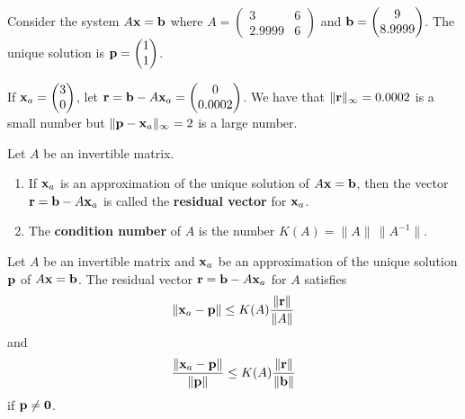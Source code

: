 \begin{egg}
Consider the system $A\mathbf{x} = \mathbf{b}$ where
$\displaystyle
A = \begin{pmatrix}
3 & 6 \\
2.9999 & 6
\end{pmatrix}$ and
$\displaystyle
\mathbf{b} = \begin{pmatrix}
9 \\ 8.9999
\end{pmatrix}
$.
The unique solution is
$\displaystyle
\mathbf{p} = \begin{pmatrix}
1 \\ 1
\end{pmatrix}
$.

If
$\displaystyle
\mathbf{x}_a = \begin{pmatrix}
3 \\ 0
\end{pmatrix}
$, let
$\displaystyle
\mathbf{r} = \mathbf{b} - A\mathbf{x}_a =
\begin{pmatrix}
0 \\ 0.0002
\end{pmatrix}$.
We have that $\|\mathbf{r}\|_\infty = 0.0002$ is a small number but
$\|\mathbf{p} - \mathbf{x}_a\|_\infty = 2$ is a large number.
\end{egg}

\begin{defn}
Let $A$ be an invertible \nn matrix.
\begin{enumerate}
\item If $\mathbf{x}_a$ is an approximation of the unique solution of
$A\mathbf{x} = \mathbf{b}$, then the vector
$\mathbf{r} = \mathbf{b} - A \mathbf{x}_a$ is 
called the {\bfseries residual vector} for $\mathbf{x}_a$.
\item The {\bfseries condition number} of $A$
is the number
$K(A) = \| A \| \, \|A^{-1} \|$.
\end{enumerate}
\end{defn}

\begin{theorem} \label{ResErrCondNbr}
Let $A$ be an invertible matrix and $\mathbf{x}_a$ be an approximation
of the unique solution $\mathbf{p}$ of $A\mathbf{x} = \mathbf{b}$. The residual
vector $\mathbf{r} = \mathbf{b} - A \mathbf{x}_a$ for $A$ satisfies
\[
\| \mathbf{x}_a - \mathbf{p} \| \leq K(A) \frac{\|\mathbf{r}\|}{\|A\|}
\]
and
\[
\frac{\| \mathbf{x}_a - \mathbf{p} \|}{\| \mathbf{p} \|} \leq K(A)
\frac{\|\mathbf{r}\|}{\|\mathbf{b} \|}
\]
if $\mathbf{p} \neq \mathbf{0}$.
\end{theorem}

